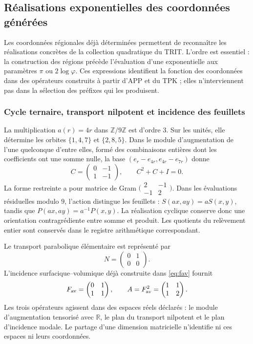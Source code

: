 \subsection{Réalisations exponentielles des coordonnées générées}
\label{euler-trit-articulacion}

Les coordonnées régionales déjà déterminées permettent de reconnaître les
réalisations concrètes de la collection quadratique du TRIT. L'ordre est
essentiel : la construction des régions précède l'évaluation d'une
exponentielle aux paramètres \(\pi\) ou \(2\log\varphi\). Ces expressions
identifient la fonction des coordonnées dans des opérateurs construits à partir
d'APP et du TPK ; elles n'interviennent pas dans la sélection des préfixes qui les produisent.

\subsubsection{Cycle ternaire, transport nilpotent et incidence des feuillets}

La multiplication \(a(r)=4r\) dans \(\mathbb Z/9\mathbb Z\) est d’ordre
\(3\). Sur les unités, elle détermine les orbites \(\{1,4,7\}\) et
\(\{2,8,5\}\). Dans le module d’augmentation de l’une quelconque d’entre elles, formé
des combinaisons entières dont les coefficients ont une somme nulle, la base
\((e_r-e_{4r},e_{4r}-e_{7r})\) donne
\[
 C=\begin{pmatrix}0&-1\\1&-1\end{pmatrix},
 \qquad C^2+C+I=0.
\]
La forme restreinte a pour matrice de Gram
\(\bigl(\begin{smallmatrix}2&-1\\-1&2\end{smallmatrix}\bigr)\).
Dans les évaluations résiduelles modulo \(9\), l’action distingue les feuillets :
\(S(ax,ay)=aS(x,y)\), tandis que \(P(ax,ay)=a^{-1}P(x,y)\).
La réalisation cyclique conserve donc une orientation contragrédiente
entre somme et produit. Les quotients du relèvement entier sont conservés
dans le registre arithmétique correspondant.

Le transport parabolique élémentaire est représenté par
\[
 N=\begin{pmatrix}0&1\\0&0\end{pmatrix}.
\]
L’incidence surfacique--volumique déjà construite dans \eqref{eq:fav} fournit
\[
 F_{\rm av}=\begin{pmatrix}0&1\\1&1\end{pmatrix},
 \qquad A=F_{\rm av}^2=\begin{pmatrix}1&1\\1&2\end{pmatrix}.
\]
Les trois opérateurs agissent dans des espaces réels déclarés : le module
d’augmentation tensorisé avec \(\mathbb R\), le plan du transport nilpotent et
le plan d’incidence modale. Le partage d’une dimension matricielle n’identifie
ni ces espaces ni leurs coordonnées.

